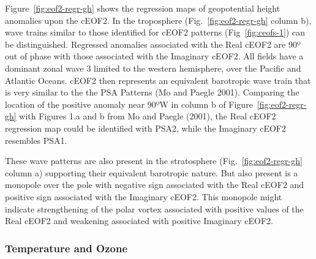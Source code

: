 \documentclass[smallextended]{svjour3}       %
\begin{document}
Figure~\ref{fig:eof2-regr-gh} shows the regression maps of geopotential height anomalies upon the cEOF2.
In the troposphere (Fig.~\ref{fig:eof2-regr-gh} column b), wave trains similar to those identified for cEOF2 patterns (Fig~\ref{fig:ceofs-1}) can be distinguished.
Regressed anomalies associated with the Real cEOF2 are 90º out of phase with those associated with the Imaginary cEOF2.
All fields have a dominant zonal wave 3 limited to the western hemisphere, over the Pacific and Atlantic Oceans.
cEOF2 then represents an equivalent barotropic wave train that is very similar to the the PSA Patterns (Mo and Paegle 2001).
Comparing the location of the positive anomaly near 90ºW in column b of Figure~\ref{fig:eof2-regr-gh} with Figures 1.a and b from Mo and Paegle (2001), the Real cEOF2 regression map could be identified with PSA2, while the Imaginary cEOF2 resembles PSA1.

These wave patterns are also present in the stratosphere (Fig.~\ref{fig:eof2-regr-gh} column a) supporting their equivalent barotropic nature.
But also present is a monopole over the pole with negative sign associated with the Real cEOF2 and positive sign associated with the Imaginary cEOF2.
This monopole might indicate strengthening of the polar vortex associated with positive values of the Real cEOF2 and weakening associated with positive Imaginary cEOF2.

\hypertarget{temp-ozone}{%
\subsubsection{Temperature and Ozone}\label{temp-ozone}}
\end{document}
